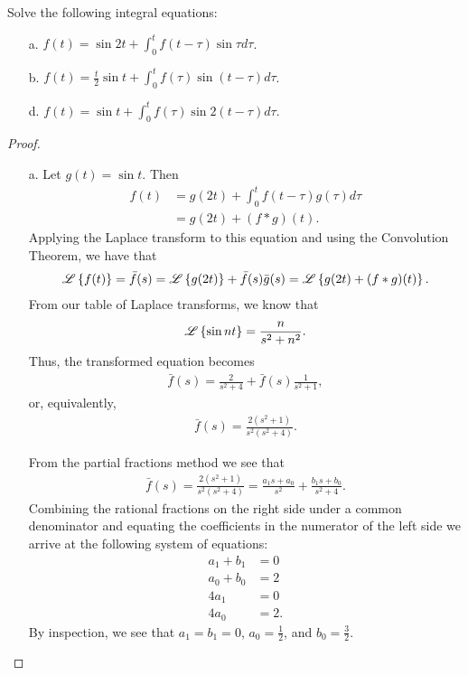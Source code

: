 \begin{problem}{4.25}
  Solve the following integral equations:
  \begin{enumerate}
    \item[a.] $\displaystyle f(t) = \sin 2 t + \int_0^t f(t-\tau)\sin \tau d\tau$.
    \item[b.] $\displaystyle f(t) = \frac{t}{2}\sin t + \int_0^t f(\tau)\sin (t - \tau) d\tau$.
    \item[d.] $\displaystyle f(t) = \sin t + \int_0^t f(\tau)\sin 2(t-\tau) d\tau$.
  \end{enumerate}
\end{problem}

\begin{proof}
  \begin{enumerate}
    \item[a.] Let $g(t) = \sin t$. Then
      \begin{align*}
        f(t) &= g(2t) + \int_0^t f(t-\tau)g(\tau) d\tau \\
        &= g(2t) + (f \ast g)(t).
      \end{align*}
      Applying the Laplace transform to this equation and using the Convolution Theorem, we have that
      \begin{align*}
        \mathscr{L}\left\{ {f(t)} \right\} = \bar{f}(s) = \mathscr{L}\left\{ {g(2t)} \right\} + \bar{f}(s)\bar{g}(s) = \mathscr{L}\left\{ {g(2t) + (f \ast g)(t)} \right\}.
      \end{align*}
      From our table of Laplace transforms, we know that
      \begin{align*}
        \mathscr{L}\left\{ {\sin n t} \right\} = \frac{n}{s^2 + n^2}.
      \end{align*}
      Thus, the transformed equation becomes
      \begin{align*}
        \bar{f}(s) = \frac{2}{s^2 + 4} + \bar{f}(s)\frac{1}{s^2 + 1},
      \end{align*}
      or, equivalently,
      \begin{align*}
        \bar{f}(s) = \frac{2(s^2 + 1)}{s^2(s^2+4)}.
      \end{align*}

      From the partial fractions method we see that
      \begin{align*}
        \bar{f}(s) = \frac{2(s^2 + 1)}{s^2(s^2+4)} = \frac{a_1 s + a_0}{s^2} + \frac{b_1 s + b_0}{s^2 + 4}.
      \end{align*}
      Combining the rational fractions on the right side under a common denominator and equating the coefficients in the numerator of the left side
      we arrive at the following system of equations:
      \begin{align*}
        a_1 + b_1 &= 0 \\
        a_0 + b_0 &= 2 \\
        4a_1 &= 0 \\
        4a_0 &= 2.
      \end{align*}
      By inspection, we see that $a_1 = b_1 = 0$, $a_0 = \frac{1}{2}$, and $b_0 = \frac{3}{2}$.


\end{enumerate}
\end{proof}
